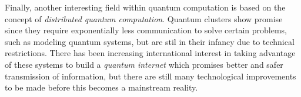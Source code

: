 \documentclass[../../dissertation.tex]{subfiles}
\begin{document}
Finally, another interesting field within quantum computation is based on the
concept of \textit{distributed quantum computation}. Quantum clusters show
promise since they require exponentially less communication to solve certain
problems, such as modeling quantum systems, but are stil in their infancy due
to technical restrictions. There has been increasing international interest in
taking advantage of these systems to build a \textit{quantum internet} which
promises better and safer transmission of information, but there are still many
technological improvements to be made before this becomes a mainstream reality. 

\end{document}
